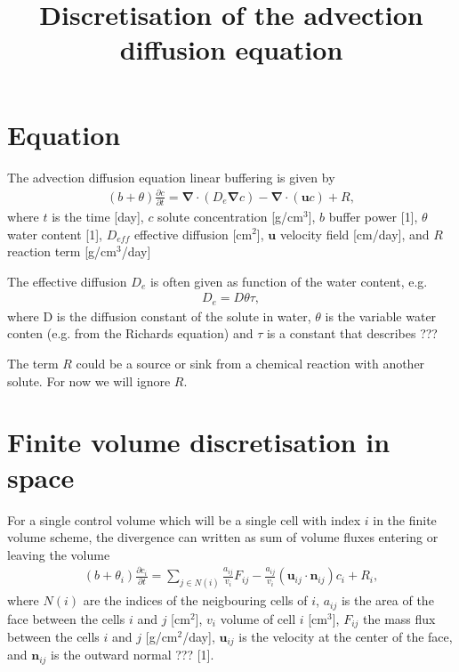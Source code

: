 \documentclass[a4paper,10pt]{article}
\title{Discretisation of the advection diffusion equation}
\author{}
\begin{document}
\maketitle

\section{Equation}

The advection diffusion equation linear buffering is given by
\begin{eqnarray}
 (b+\theta) \frac{\partial c}{\partial t}  = \mathbf{\nabla} \cdot (D_e \mathbf{\nabla} c) - \mathbf{\nabla} \cdot (\mathbf{u} c) + R,  
\end{eqnarray}
where $t$ is the time [day], $c$  solute concentration [g/cm$^3$], $b$ buffer power [1], $\theta$ water content [1], $D_{eff}$ effective diffusion [cm$^2$], $\mathbf{u}$ velocity field [cm/day], and $R$ reaction term [g/cm$^3$/day]    

The effective diffusion $D_e$ is often given as function of the water content, e.g.
\begin{eqnarray}
 D_e = D \theta  \tau,  
\end{eqnarray}
where D is the diffusion constant of the solute in water, $\theta$ is the variable water conten (e.g. from the Richards equation) and $\tau$ is a constant that describes ???

The term $R$ could be a source or sink from a chemical reaction with another solute. For now we will ignore $R$.  

\section{Finite volume discretisation in space}

For a single control volume which will be a single cell with index $i$ in the finite volume scheme, the divergence can written as sum of volume fluxes entering or leaving the volume
\begin{eqnarray}
 (b+\theta_i) \frac{\partial c_i}{\partial t}  = \sum_{j \in N(i)} \frac{a_{ij}}{v_i}  F_{ij} - \frac{a_{ij}}{v_i}(\mathbf{u}_{ij} \cdot \mathbf{n}_{ij}) c_i + R_i,  \label{eqn:fv}
\end{eqnarray}
where $N(i)$ are the indices of the neigbouring cells of $i$, $a_{ij}$ is the area of the face between the cells $i$ and $j$ [cm$^2$], $v_i$ volume of cell $i$ [cm$^3$], $F_{ij}$ the mass flux between the cells $i$ and $j$ [g/cm$^2$/day], $\mathbf{u}_{ij}$ is the velocity at the center of the face, and $\mathbf{n}_{ij}$ is the outward normal ??? [1].
\end{document}
